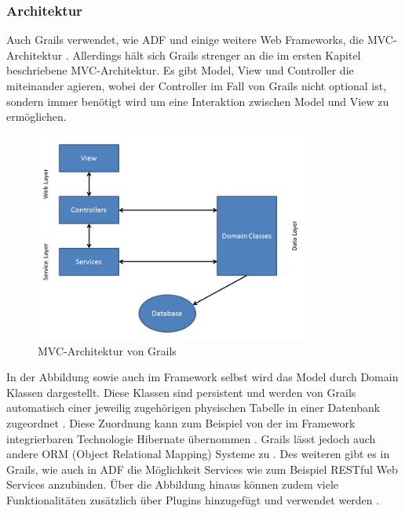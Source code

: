 \subsubsection{Architektur}
Auch Grails verwendet, wie ADF und einige weitere Web Frameworks, die MVC-Architektur \citep[S.208]{GGR2009}. Allerdings hält sich Grails strenger an die im ersten Kapitel beschriebene MVC-Architektur. Es gibt Model, View und Controller die miteinander agieren, wobei der Controller im Fall von Grails nicht optional ist, sondern immer benötigt wird um eine Interaktion zwischen Model und View zu ermöglichen\citep[S.8]{DGG2002}.\\
\begin{figure}[H]
\centering
\includegraphics[width=0.80\textwidth]{img/Folie1.png}
\caption {MVC-Architektur von Grails \citep[S.220]{GGR2009}}
\end{figure}
In der Abbildung sowie auch im Framework selbst wird das Model durch Domain Klassen dargestellt. Diese Klassen sind persistent und werden von Grails automatisch einer jeweilig zugehörigen physischen Tabelle in einer Datenbank zugeordnet \citep[S.17]{DGG2002}. Diese Zuordnung kann zum Beispiel von der im Framework integrierbaren Technologie Hibernate übernommen \citep[S.18]{DGG2002}. Grails lässt jedoch auch andere ORM (Object Relational Mapping) Systeme zu \citep{GPO2015}. Des weiteren gibt es in Grails, wie auch in ADF die Möglichkeit Services wie zum Beispiel RESTful Web Services anzubinden. Über die Abbildung hinaus können zudem viele Funktionalitäten zusätzlich über Plugins hinzugefügt und verwendet werden \citep[S.3]{DGG2002}.\\

